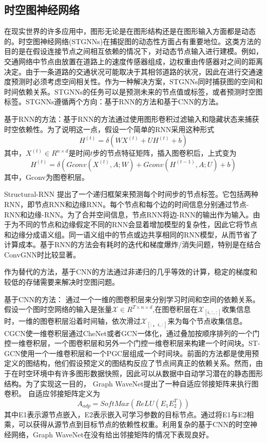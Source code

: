 \subsection{时空图神经网络}
在现实世界的许多应用中，图形无论是在图形结构还是在图形输入方面都是动态的。时空图神经网络(STGNNs)在捕捉图的动态性方面占有重要地位。这类方法的目的是在假设连接节点之间相互依赖的情况下，对动态节点输入进行建模。例如，交通网络中节点由放置在道路上的速度传感器组成，边权重由传感器对之间的距离决定。由于一条道路的交通状况可能取决于其相邻道路的状况，因此在进行交通速度预测时必须考虑空间相关性。作为一种解决方案，STGNNs同时捕获图的空间和时间依赖关系。STGNNs的任务可以是预测未来的节点值或标签，或者预测时空图标签。STGNNs遵循两个方向：基于RNN的方法和基于CNN的方法。

基于RNN的方法：基于RNN的方法通过使用图形卷积过滤输入和隐藏状态来捕获时空依赖性。为了说明这一点，假设一个简单的RNN采用这种形式
\[
H^{(t)}=\delta(WX^{(t)}+UH^{(t)}+b)
\]
其中，$X^{(t)}\in R^{n\times d}$是时间$t$步的节点特征矩阵，插入图卷积后，上式变为
\[
H^{(t)}=\delta(Gconv(X^{(t)},A;W)+Gconv(H^{(t-1)},A;U)+b)
\]
其中，Gconv为图卷积层。

Structural-RNN \cite{jain2016structural}提出了一个递归框架来预测每个时间步的节点标签。它包括两种RNN，即节点RNN和边缘RNN。每个节点和每个边的时间信息分别通过节点-RNN和边缘-RNN。为了合并空间信息，节点RNN将边-RNN的输出作为输入。由于为不同的节点和边缘假定不同的RNN会显着增加模型的复杂性，因此它将节点和边缘分成语义组。同一语义组中的节点或边共享相同的RNN模型，从而节省了计算成本。基于RNN的方法会有耗时的迭代和梯度爆炸/消失问题，特别是在结合ConvGNN时比较显著。

作为替代的方法，基于CNN的方法通过非递归的几乎等效的计算，稳定的梯度和较低的存储需要来解决时空图问题。

基于CNN的方法：
通过一个一维的图卷积层来分别学习时间和空间的依赖关系。假设一个图时空网络的输入是张量$\mathcal{X}\in R^{T \times n \times d}$,在图卷积层在$\mathcal{X}_{[i,:,:]}$收集信息时，一维的图卷积层沿着时间轴，依次滑过$\mathcal{X}_{[:，i,:]}$来为每个节点收集信息。CGCN使一维卷积层通过CheNet或者GCN一体化，通过叠加按顺序排列的一个门控一维卷积层，一个图卷积层和另外一个门控一维卷积层来构建一个时间块。ST-GCN使用一个一维卷积层和一个PGC层组成一个时间块。前面的方法都是使用预定义的图结构，他们假设预定义的图结构反应了节点间真正的依赖关系。然而，由于在时空环境中有许多图形数据快照，因此可以从数据中自动学习潜在的静态图形结构。为了实现这一目的，
Graph WaveNet\cite{wu2019graph}提出了一种自适应邻接矩阵来执行图卷积。
自适应邻接矩阵定义为
\[
A_{adp}=SoftMax(ReLU(E_1E_2^T))
\]
其中E1表示源节点嵌入，E2表示嵌入可学习参数的目标节点。通过将E1与E2相乘，可以获得从源节点到目标节点的依赖性权重。利用复杂的基于CNN的时空神经网络，Graph WaveNet在没有给出邻接矩阵的情况下表现良好。

